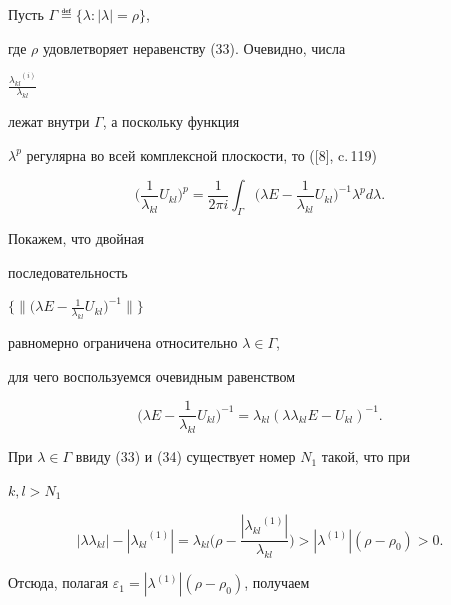\begin{pf}


Пусть $\Gamma\eqdef \{\lambda:|\lambda|=\rho\}$,


где $\rho$ удовлетворяет неравенству (33). Очевидно, числа


$\frac{{\lambda_{kl}}^{(i)}}{\lambda_{kl}}$


лежат внутри $\Gamma$, а поскольку функция


$\lambda^p$ регулярна во всей комплексной плоскости, то ([8], c.\,119)


\begin{equation}


\bigg(\frac{1}{\lambda_{kl}}U_{kl}\bigg)^p=\frac{1}{2\pi i}


\int_\Gamma\bigg(\lambda E-\frac{1}{\lambda_{kl}}U_{kl}\bigg)^{-1}


\lambda^pd\lambda.


\end{equation}


Покажем, что двойная 


последовательность


$\big\{\big\|\big(\lambda E-\frac{1}


{\lambda_{kl}}U_{kl}\big)^{-1}\big\|\big\}$


равномерно ограничена относительно $\lambda\in\Gamma$,


для чего воспользуемся очевидным равенством


\begin{equation}


\bigg(\lambda E-\frac{1}{\lambda_{kl}}U_{kl}\bigg)^{-1}


=\lambda_{kl}(\lambda\lambda_{kl}E-U_{kl})^{-1}.


\end{equation}


При $\lambda\in\Gamma$ ввиду (33) и (34) существует номер $N_1$ такой, что при


$k,l>N_1$


$$


|\lambda\lambda_{kl}|-|{\lambda_{kl}}^{(1)}|


=\lambda_{kl}\bigg(\rho-\frac{|{\lambda_{kl}}^{(1)}|}{  \lambda_{kl}  }\bigg)>


|\lambda^{(1)}|(\rho-\rho_0)>0.


$$


Отсюда, полагая ${\varepsilon}_1=|\lambda^{(1)}|(\rho-\rho_0)$, получаем


\begin{equation}



\end{equation}
\end{pf}
